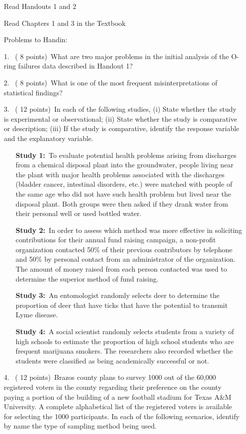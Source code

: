 \documentclass[10pt]{report}
\def\be{\begin{enumerate}}
\def\ee{\end{enumerate}}
\begin{document}
\begin{enumerate}
\item[\bul] Read Handouts 1 and 2
\item[\bul] Read Chapters 1 and 3 in the Textbook
\item[\bul] Problems to Handin:
\item[1.]\ ( 8 points)\ What are two major problems in the initial analysis of the O-ring failures data described in Handout 1?
\item[2.]\ ( 8 points)\  What is one of the most frequent misinterpretations of statistical findings?
\item[3.]\ ( 12 points)\  In each of the following studies, (i) State whether the study is experimental or observational; (ii) State whether the study is comparative or description;
(iii) If the study is comparative, identify the response variable and the explanatory variable.
\be
\item[\bul] {\bf Study 1:}\ To evaluate potential health problems arising from discharges from a chemical disposal plant into the groundwater, people living near the plant with major health problems associated with the discharges (bladder cancer, intestinal disorders, etc.) were matched with people of the same age who did not have such health problem but lived near the disposal plant. Both groups were then asked if they drank water from their personal well or used bottled water.
\item[\bul] {\bf Study 2:}\ In order to assess which method was more effective in soliciting contributions for their annual fund raising campaign, a non-profit organization contacted 50\% of their previous contributors by telephone and 50\% by personal contact from an administrator of the organization. The amount of money raised from each person contacted was used to determine the superior method of fund raising.
\item[\bul] {\bf Study 3:}\ An entomologist randomly selects deer to determine the proportion of deer that have ticks that have the potential to transmit Lyme disease.
\item[\bul] {\bf Study 4:}\ A social scientist randomly selects students from a variety of high schools to estimate the proportion of high school students who are frequent marijuana smokers. The researchers also recorded whether the students were classified as being  academically successful or not.
\ee
\item[4.]\ ( 12 points)\  Brazos county plans to survey 1000 out of the 60,000 registered voters in the county regarding their preference on the county paying a portion of the building of a new football stadium for Texas A\&M University. A complete alphabetical list of the registered voters is available for selecting the 1000 participants. In each of the following scenarios, identify by name the type of sampling method being used.

\end{enumerate}
\end{document}
